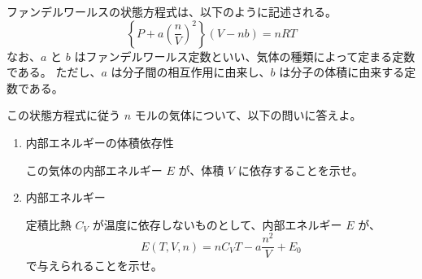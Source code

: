 \documentclass[uplatex,dvipdfmx,a4paper,11pt]{jsarticle}
\begin{document}
\begin{enumerate}
ファンデルワールスの状態方程式は、以下のように記述される。
\begin{equation*}
	\left\{ P + a \left(\dfrac{n}{V} \right)^2 \right\} \left(V - nb \right) = nRT
        \label{eq:van_der_Waals}
\end{equation*}
なお、$a$ と $b$ はファンデルワールス定数といい、気体の種類によって定まる定数である。
ただし、$a$ は分子間の相互作用に由来し、$b$ は分子の体積に由来する定数である。

この状態方程式に従う $n$ モルの気体について、以下の問いに答えよ。
\begin{enumerate}
\setlength{\parskip}{0cm} %
\setlength{\itemsep}{0.3cm} %

\item
内部エネルギーの体積依存性

この気体の内部エネルギー $E$ が、体積 $V$ に依存することを示せ。

%
%
%

\item
内部エネルギー

定積比熱 $C_V$ が温度に依存しないものとして、内部エネルギー $E$ が、
\begin{equation*}
E(T, V, n) = n C_V T - a\dfrac{n^2}{V} + E_0
\end{equation*}
で与えられることを示せ。


\end{enumerate}
\end{enumerate}
\end{document}
